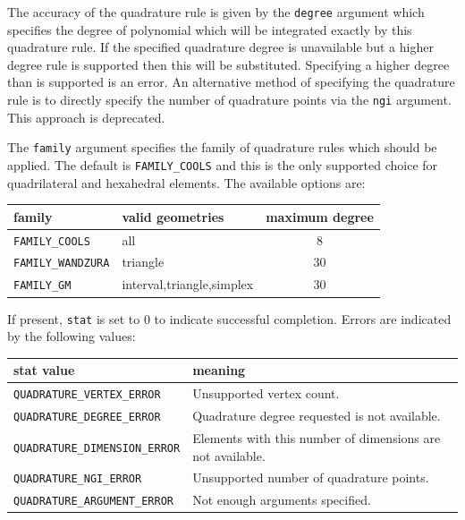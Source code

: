 \documentclass[a4paper, 11pt]{book}
\begin{document}
The accuracy of the quadrature rule is given by the \lstinline+degree+
argument which specifies the degree of polynomial which will be integrated
exactly by this quadrature rule. If the specified quadrature degree is
unavailable but a higher degree rule is supported then this will be
substituted. Specifying a higher degree than is supported is an error.
An alternative method of specifying the quadrature rule is to directly
specify the number of quadrature points via the \lstinline+ngi+
argument. This approach is deprecated. 

The \lstinline+family+ argument specifies the family of quadrature rules
which should be applied. The default is \lstinline+FAMILY_COOLS+ and this is
the only supported choice for quadrilateral and hexahedral elements. The
available options are:

\begin{center}
  \begin{tabular}{llc}
    \textbf{family}&\textbf{valid geometries} & \textbf{maximum degree}\\\hline
    \lstinline+FAMILY_COOLS+& all & 8 \\
    \lstinline+FAMILY_WANDZURA+& triangle & 30 \\
    \lstinline+FAMILY_GM+& interval,triangle,simplex & 30
  \end{tabular}
\end{center}

If present, \lstinline+stat+ is set to 0 to indicate successful
completion. Errors are indicated by the following values:

\begin{center}
  \begin{tabular}{ll}
    \textbf{stat value} & \textbf{meaning}\\\hline
    \lstinline+QUADRATURE_VERTEX_ERROR+ & Unsupported vertex count.\\
    \lstinline+QUADRATURE_DEGREE_ERROR+ &Quadrature degree requested is not available.\\
    \lstinline+QUADRATURE_DIMENSION_ERROR+ & Elements with this number of dimensions are not available.\\
    \lstinline+QUADRATURE_NGI_ERROR+ & Unsupported number of quadrature points.\\ 
    \lstinline+QUADRATURE_ARGUMENT_ERROR+ & Not enough arguments specified.\\
  \end{tabular}
\end{center}
\end{document}
